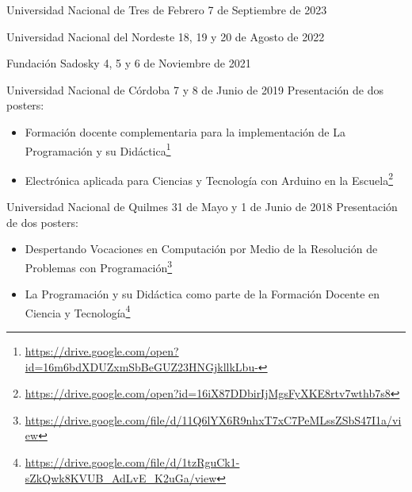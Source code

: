 \begin{enumerate}[leftmargin=0.8cm]
{\begin{itemize}[leftmargin=0.2cm]
      {Universidad Nacional de Tres de Febrero}
      {7 de Septiembre de 2023}

      {Universidad Nacional del Nordeste}
      {18, 19 y 20 de Agosto de 2022}

      {Fundación Sadosky}
      {4, 5 y 6 de Noviembre de 2021}

      {Universidad Nacional de Córdoba}
      {7 y 8 de Junio de 2019}
      {Presentación de dos posters:}

      \begin{itemize}
        \item Formación docente complementaria para la implementación de La Programación y su Didáctica\footnote{
          \url{https://drive.google.com/open?id=16m6bdXDUZxmSbBeGUZ23HNGjkllkLbu-}}
        \item Electrónica aplicada para Ciencias y Tecnología con Arduino en la Escuela\footnote{
          \url{https://drive.google.com/open?id=16iX87DDbirIjMgsFyXKE8rtv7wthb7s8}}
      \end{itemize}
      \medskip

      {Universidad Nacional de Quilmes}
      {31 de Mayo y 1 de Junio de 2018}
      {Presentación de dos posters:}

      \begin{itemize}
        \item Despertando Vocaciones en Computación por Medio de la Resolución de Problemas con Programación\footnote{
          \url{https://drive.google.com/file/d/11Q6lYX6R9nhxT7xC7PeMLssZSbS47I1a/view}}
        \item La Programación y su Didáctica como parte de la Formación Docente en Ciencia y Tecnología\footnote{
          \url{https://drive.google.com/file/d/1tzRguCk1-sZkQwk8KVUB_AdLvE_K2uGa/view}}
      \end{itemize}
      \medskip


\end{itemize}}
\end{enumerate}
